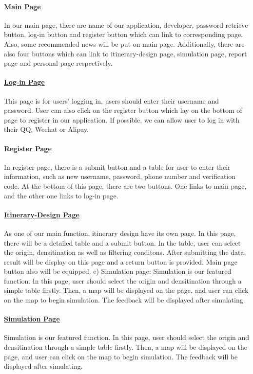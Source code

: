 \documentclass[10pt]{article}
\begin{document}
\paragraph{\underline{Main Page}}
In our main page, there are name of our application, developer, password-retrieve button, log-in button and register button which can link to corresponding page. Also, some recommended news will be put on main page. Additionally, there are also four buttons which can link to itinerary-design page, simulation page, report page and personal page respectively.

\paragraph{\underline{Log-in Page}}
This page is for users’ logging in, users should enter their username and password. User can also click on the register button which lay on the bottom of page to register in our application. If possible, we can allow user to log in with their QQ, Wechat or Alipay.

\paragraph{\underline{Register Page}}
In register page, there is a submit button and a table for user to enter their information, such as new username, password, phone number and verification code. At the bottom of this page, there are two buttons. One links to main page, and the other one links to log-in page.

\paragraph{\underline{Itinerary-Design Page}}
As one of our main function, itinerary design have its own page. In this page, there will be a detailed table and a submit button. In the table, user can select the origin, densitination as well as filtering conditons. After submitting the data, result will be display on this page and a return button is provided. Main page button also will be equipped.
e)	Simulation page: Simulation is our featured function. In this page, user should select the origin and densitination through a simple table firstly. Then, a map will be displayed on the page, and user can click on the map to begin simulation. The feedback will be displayed after simulating.

\paragraph{\underline{Simulation Page}}
Simulation is our featured function. In this page, user should select the origin and densitination through a simple table firstly. Then, a map will be displayed on the page, and user can click on the map to begin simulation. The feedback will be displayed after simulating.
\end{document}
